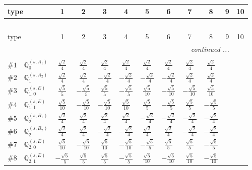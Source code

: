 \documentclass[fleqn,9pt,landscape]{jsarticle}
\begin{document}
\begin{center}
\renewcommand{\arraystretch}{1.3}
\begin{longtable}{lcccccccccc}
 \hline \hline
type & 1 & 2 & 3 & 4 & 5 & 6 & 7 & 8 & 9 & 10 \\ \hline \endfirsthead

\multicolumn{10}{l}{\tablename\ \thetable{}} \\
 \hline \hline
type & 1 & 2 & 3 & 4 & 5 & 6 & 7 & 8 & 9 & 10 \\ \hline \endhead

 \hline \hline
\multicolumn{10}{r}{\footnotesize\it continued ...} \\ \endfoot

 \hline \hline
\multicolumn{10}{r}{} \\ \endlastfoot

$ \#1\quad \mathbb{Q}_{0}^{(s,A_{1})} $ & $ \frac{\sqrt{2}}{4} $ & $ \frac{\sqrt{2}}{4} $ & $ \frac{\sqrt{2}}{4} $ & $ \frac{\sqrt{2}}{4} $ & $ \frac{\sqrt{2}}{4} $ & $ \frac{\sqrt{2}}{4} $ & $ \frac{\sqrt{2}}{4} $ & $ \frac{\sqrt{2}}{4} $ \\ \hline
$ \#2\quad \mathbb{Q}_{1}^{(s,A_{2})} $ & $ \frac{\sqrt{2}}{4} $ & $ \frac{\sqrt{2}}{4} $ & $ - \frac{\sqrt{2}}{4} $ & $ - \frac{\sqrt{2}}{4} $ & $ - \frac{\sqrt{2}}{4} $ & $ - \frac{\sqrt{2}}{4} $ & $ \frac{\sqrt{2}}{4} $ & $ \frac{\sqrt{2}}{4} $ \\ \hline
$ \#3\quad \mathbb{Q}_{1,0}^{(s,E)} $ & $ \frac{\sqrt{5}}{5} $ & $ - \frac{\sqrt{5}}{5} $ & $ \frac{\sqrt{5}}{5} $ & $ - \frac{\sqrt{5}}{5} $ & $ \frac{\sqrt{5}}{10} $ & $ - \frac{\sqrt{5}}{10} $ & $ - \frac{\sqrt{5}}{10} $ & $ \frac{\sqrt{5}}{10} $ \\ \hline
$ \#4\quad \mathbb{Q}_{1,1}^{(s,E)} $ & $ \frac{\sqrt{5}}{10} $ & $ - \frac{\sqrt{5}}{10} $ & $ - \frac{\sqrt{5}}{10} $ & $ \frac{\sqrt{5}}{10} $ & $ \frac{\sqrt{5}}{5} $ & $ - \frac{\sqrt{5}}{5} $ & $ \frac{\sqrt{5}}{5} $ & $ - \frac{\sqrt{5}}{5} $ \\ \hline
$ \#5\quad \mathbb{Q}_{2}^{(s,B_{1})} $ & $ \frac{\sqrt{2}}{4} $ & $ \frac{\sqrt{2}}{4} $ & $ \frac{\sqrt{2}}{4} $ & $ \frac{\sqrt{2}}{4} $ & $ - \frac{\sqrt{2}}{4} $ & $ - \frac{\sqrt{2}}{4} $ & $ - \frac{\sqrt{2}}{4} $ & $ - \frac{\sqrt{2}}{4} $ \\ \hline
$ \#6\quad \mathbb{Q}_{2}^{(s,B_{2})} $ & $ \frac{\sqrt{2}}{4} $ & $ \frac{\sqrt{2}}{4} $ & $ - \frac{\sqrt{2}}{4} $ & $ - \frac{\sqrt{2}}{4} $ & $ \frac{\sqrt{2}}{4} $ & $ \frac{\sqrt{2}}{4} $ & $ - \frac{\sqrt{2}}{4} $ & $ - \frac{\sqrt{2}}{4} $ \\ \hline
$ \#7\quad \mathbb{Q}_{2,0}^{(s,E)} $ & $ \frac{\sqrt{5}}{10} $ & $ - \frac{\sqrt{5}}{10} $ & $ \frac{\sqrt{5}}{10} $ & $ - \frac{\sqrt{5}}{10} $ & $ - \frac{\sqrt{5}}{5} $ & $ \frac{\sqrt{5}}{5} $ & $ \frac{\sqrt{5}}{5} $ & $ - \frac{\sqrt{5}}{5} $ \\ \hline
$ \#8\quad \mathbb{Q}_{2,1}^{(s,E)} $ & $ - \frac{\sqrt{5}}{5} $ & $ \frac{\sqrt{5}}{5} $ & $ \frac{\sqrt{5}}{5} $ & $ - \frac{\sqrt{5}}{5} $ & $ \frac{\sqrt{5}}{10} $ & $ - \frac{\sqrt{5}}{10} $ & $ \frac{\sqrt{5}}{10} $ & $ - \frac{\sqrt{5}}{10} $ \\
\end{longtable}
\end{center}
\end{document}

